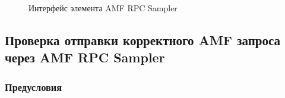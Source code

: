 \begin{enumerate}
\begin{figure}[ht]
\caption{Интерфейс элемента AMF RPC Sampler}
\label{ris:amfSampler.png}
\end{figure}

\end{enumerate}

\subsection{Проверка отправки корректного AMF запроса через AMF RPC Sampler}

\subsubsection{Предусловия}

